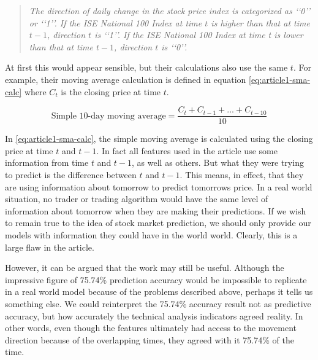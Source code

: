 \documentclass{report}
\begin{document}
\begin{quotation}
\textit{The direction of daily change in the stock price index is categorized
as ‘‘0’’ or ‘‘1’’. If the ISE National 100 Index at time $t$ is higher
than that at time $t-1$, direction $t$ is ‘‘1’’. If the ISE National 100
Index at time t is lower than that at time $t-1$, direction $t$ is ‘‘0’’.}
\end{quotation}

At first this would appear sensible, but their calculations also use the same $t$. For example, their moving average calculation is defined in equation \ref{eq:article1-sma-calc} where $C_{t}$ is the closing price at time $t$.

  \begin{figure}[H]
  \begin{center}
      \begin{equation}
        \text{Simple 10-day moving average} = \dfrac
          {C_{t} + C_{t-1} + ... + C_{t-10}} {10}
        \label{eq:article1-sma-calc}
      \end{equation}
  \end{center}
  \end{figure} 

In \ref{eq:article1-sma-calc}, the simple moving average is calculated using the closing price at time $t$ and $t-1$. In fact all features used in the article use some information from time $t$ and $t-1$, as well as others. But what they were trying to predict is the difference between $t$ and $t-1$. This means, in effect, that they are using information about tomorrow to predict tomorrows price. In a real world situation, no trader or trading algorithm would have the same level of information about tomorrow when they are making their predictions. If we wish to remain true to the idea of stock market prediction, we should only provide our models with information they could have in the world world. Clearly, this is a large flaw in the article. 

However, it can be argued that the work may still be useful. Although the impressive figure of 75.74\% prediction accuracy would be impossible to replicate in a real world model because of the problems described above, perhaps it tells us something else. We could reinterpret the 75.74\% accuracy result not as predictive accuracy, but how accurately the technical analysis indicators agreed reality. In other words, even though the features ultimately had access to the movement direction because of the overlapping times, they agreed with it 75.74\% of the time. 
\end{document}
